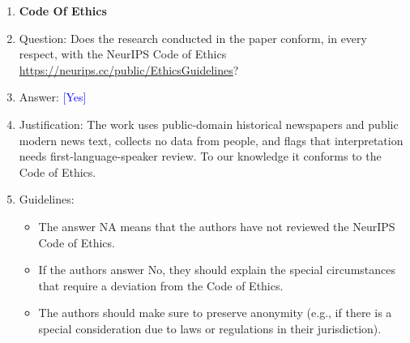 \documentclass[10pt,letterpaper]{article}
\newcommand{\answerYes}[1][]{\textcolor{blue}{[Yes] #1}}
\begin{document}
\begin{enumerate}
\item {\bf Code Of Ethics}
    \item[] Question: Does the research conducted in the paper conform, in every respect, with the NeurIPS Code of Ethics \url{https://neurips.cc/public/EthicsGuidelines}?
    \item[] Answer: \answerYes{}
    \item[] Justification: The work uses public-domain historical newspapers and public modern news text, collects no data from people, and flags that interpretation needs first-language-speaker review. To our knowledge it conforms to the Code of Ethics.
    \item[] Guidelines:
    \begin{itemize}
        \item The answer NA means that the authors have not reviewed the NeurIPS Code of Ethics.
        \item If the authors answer No, they should explain the special circumstances that require a deviation from the Code of Ethics.
        \item The authors should make sure to preserve anonymity (e.g., if there is a special consideration due to laws or regulations in their jurisdiction).
    \end{itemize}



\end{enumerate}
\end{document}
